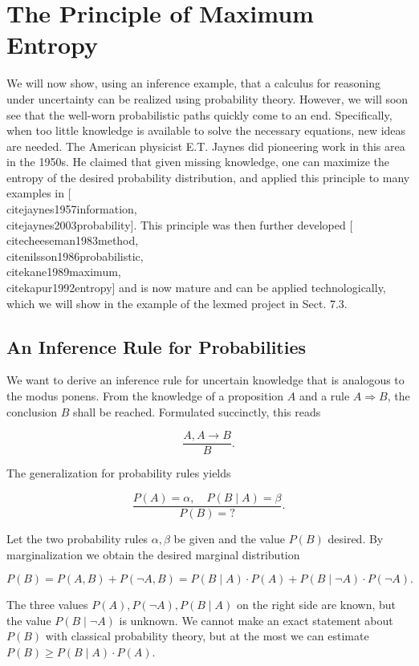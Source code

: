 \documentclass[10pt]{book}
\begin{document}
\section{The Principle of Maximum Entropy}
We will now show, using an inference example, that a calculus for reasoning under uncertainty can be realized using probability theory. However, we will soon see that the well-worn probabilistic paths quickly come to an end. Specifically, when too little knowledge is available to solve the necessary equations, new ideas are needed. The American physicist E.T. Jaynes did pioneering work in this area in the 1950s. He claimed that given missing knowledge, one can maximize the entropy of the desired probability distribution, and applied this principle to many examples in [\\cite{jaynes1957information}, \\cite{jaynes2003probability}]. This principle was then further developed [\\cite{cheeseman1983method}, \\cite{nilsson1986probabilistic}, \\cite{kane1989maximum}, \\cite{kapur1992entropy}] and is now mature and can be applied technologically, which we will show in the example of the lexmed project in Sect. 7.3.

\subsection{An Inference Rule for Probabilities}
We want to derive an inference rule for uncertain knowledge that is analogous to the modus ponens. From the knowledge of a proposition $A$ and a rule $A \Rightarrow B$, the conclusion $B$ shall be reached. Formulated succinctly, this reads

$$
\frac{A, A \rightarrow B}{B} .
$$

The generalization for probability rules yields


$$
\frac{P(A)=\alpha, \quad P(B \mid A)=\beta}{P(B)=?} .
$$

Let the two probability rules $\alpha, \beta$ be given and the value $P(B)$ desired. By marginalization we obtain the desired marginal distribution

$$
P(B)=P(A, B)+P(\neg A, B)=P(B \mid A) \cdot P(A)+P(B \mid \neg A) \cdot P(\neg A) .
$$

The three values $P(A), P(\neg A), P(B \mid A)$ on the right side are known, but the value $P(B \mid \neg A)$ is unknown. We cannot make an exact statement about $P(B)$ with classical probability theory, but at the most we can estimate $P(B) \geq P(B \mid A) \cdot P(A)$.
\end{document}
